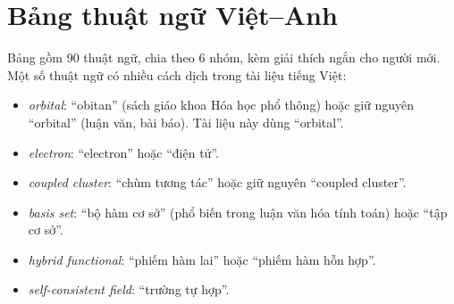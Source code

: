 \chapter{Bảng thuật ngữ Việt--Anh}
\label{pl:thuatngu}

Bảng gồm 90 thuật ngữ, chia theo 6 nhóm, kèm giải thích ngắn cho người mới. Một số thuật ngữ có nhiều cách dịch trong tài liệu tiếng Việt:
\begin{itemize}
\item \emph{orbital}: ``obitan'' (sách giáo khoa Hóa học phổ thông) hoặc giữ nguyên ``orbital'' (luận văn, bài báo). Tài liệu này dùng ``orbital''.
\item \emph{electron}: ``electron'' hoặc ``điện tử''.
\item \emph{coupled cluster}: ``chùm tương tác'' hoặc giữ nguyên ``coupled cluster''.
\item \emph{basis set}: ``bộ hàm cơ sở'' (phổ biến trong luận văn hóa tính toán) hoặc ``tập cơ sở''.
\item \emph{hybrid functional}: ``phiếm hàm lai'' hoặc ``phiếm hàm hỗn hợp''.
\item \emph{self-consistent field}: ``trường tự hợp''.
\end{itemize}

{\small
\setlength{\LTpre}{4pt}\setlength{\LTpost}{6pt}

}

